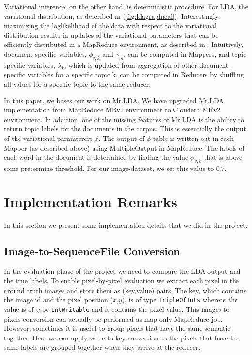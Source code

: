 \documentclass{acm_proc_article-sp}
\begin{document}
Variational inference, on the other hand, is deterministic procedure. For LDA, the variational distribution, as described in (\ref{fig:ldagraphical}). Interestingly, maximizing the loglikelihood of the data with respect to the variational distribution results in updates of the variational parameters that can be efficiently distributed in a MapReduce environment, as described in \cite{mrlda}. Intuitively, document specific variables, $\phi_{v,k}$ and $\gamma_m$, can be computed in Mappers, and topic specific variables, $\lambda_k$, which is updated from aggregation of other document-specific variables for a specific topic k, can be computed in Reducers by shuffling all values for a specific topic to the same reducer.

In this paper, we bases our work on Mr.LDA. We have upgraded Mr.LDA implementation from MapReduce MRv1 environment to Cloudera MRv2 environment. In addition, one of the missing features of Mr.LDA is the ability to return topic labels for the documents in the corpus. This is essentially the output of the variational paramterers $\phi$. The output of $\phi$-table is written out in each Mapper (as described above) using MultipleOutput in MapReduce. The labels of each word in the document is determined by finding the value $\phi_{v,k}$ that is above some pretermine threshold. For our image-dataset, we set this value to 0.7.


\section{Implementation Remarks}\label{sec:impl}
In this section we present some implementation details that we did in the project.
\subsection{Image-to-SequenceFile Conversion}
In the evaluation phase of the project we need to compare the LDA output and the true labels. To enable pixel-by-pixel evaluation we extract each pixel in the ground truth images and store them as (key,value) pairs. The key, which contains the image id and the pixel position ($x$,$y$), is of type \texttt{TripleOfInts} whereas the value is of type \texttt{IntWritable} and it contains the pixel value. This images-to-pixels conversion can actually be performed as map-only MapReduce job. However, sometimes it is useful to group pixels that have the same semantic together. Here we can apply value-to-key conversion so the pixels that have the same labels are grouped together when they arrive at the reducer.
\end{document}
